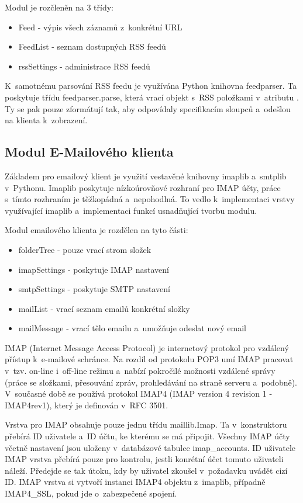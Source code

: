\documentclass[bc,male,html,dept460]{diploma}				%
\begin{document}
Modul je rozčleněn na 3 třídy:
\begin{itemize}
 \item Feed - výpis všech záznamů z~konkrétní URL
 \item FeedList - seznam dostupných RSS feedů
 \item rssSettings - administrace RSS feedů
\end{itemize}

K~samotnému parsování RSS feedu je využívána Python knihovna feedparser. Ta poskytuje třídu feedparser.parse, která vrací objekt s~RSS položkami v~atributu . Ty se pak pouze zformátují tak, aby odpovídaly specifikacím sloupců a~odešlou na klienta k~zobrazení.



\subsection{Modul E-Mailového klienta}
\label{sec:mailClient}
Základem pro emailový klient je využití vestavěné knihovny imaplib a~smtplib v~Pythonu. Imaplib poskytuje nízkoúrovňové rozhraní pro IMAP účty, práce s~tímto rozhraním je těžkopádná a~nepohodlná. To vedlo k~implementaci vrstvy využívající imaplib a~implementaci funkcí usnadňující tvorbu modulu.

\bigskip

Modul emailového klienta je rozdělen na tyto části:
\begin{itemize}
 \item folderTree - pouze vrací strom složek
 \item imapSettings - poskytuje IMAP nastavení
 \item smtpSettings - poskytuje SMTP nastavení
 \item mailList - vrací seznam emailů konkrétní složky
 \item mailMessage - vrací tělo emailu a~umožňuje odeslat nový email
\end{itemize}

IMAP (Internet Message Access Protocol) je internetový protokol pro vzdálený přístup k~e-mailové schránce. Na rozdíl od protokolu POP3 umí IMAP pracovat v~tzv. on-line i~off-line režimu a~nabízí pokročilé možnosti vzdálené správy (práce se složkami, přesouvání zpráv, prohledávání na straně serveru a~podobně). V~současné době se používá protokol IMAP4 (IMAP version 4 revision 1 - IMAP4rev1), který je definován v~RFC 3501.
\cite{imap-wiki}

Vrstva pro IMAP obsahuje pouze jednu třídu maillib.Imap. Ta v~konstruktoru přebírá ID uživatele a~ID účtu, ke kterému se má připojit.
Všechny IMAP účty včetně nastavení jsou uloženy v~databázové tabulce imap\_accounts. ID uživatele IMAP vrstva přebírá pouze pro kontrolu, jestli konrétní účet tomuto uživateli náleží. Předejde se tak útoku, kdy by uživatel zkoušel v~požadavku uvádět cizí ID.
IMAP vrstva si vytvoří instanci IMAP4 objektu z~imaplib, případně IMAP4\_SSL, pokud jde o~zabezpečené spojení.
\end{document}
